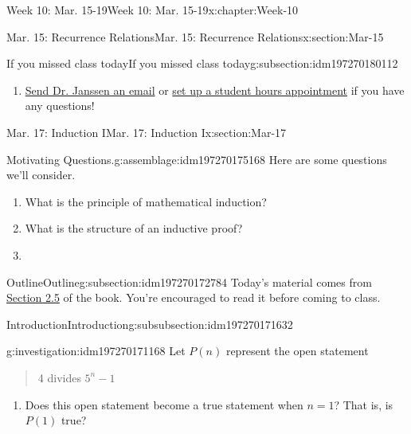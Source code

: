 \documentclass[oneside,10pt,]{book}
\numberwithin{equation}{section}
\begin{document}
\begin{chapterptx}{Week 10: Mar. 15-19}{}{Week 10: Mar. 15-19}{}{}{x:chapter:Week-10}
\begin{sectionptx}{Mar. 15: Recurrence Relations}{}{Mar. 15: Recurrence Relations}{}{}{x:section:Mar-15}
\begin{subsectionptx}{If you missed class today}{}{If you missed class today}{}{}{g:subsection:idm197270180112}
\begin{enumerate}
\item{}\href{mailto:mike.janssen@dordt.edu}{Send Dr. Janssen an email} or \href{https://calendly.com/mkjanssen/student-hours}{set up a student hours appointment} if you have any questions!%
\end{enumerate}
\end{subsectionptx}
\end{sectionptx}
%
%
\typeout{************************************************}
\typeout{************************************************}
%
\begin{sectionptx}{Mar. 17: Induction I}{}{Mar. 17: Induction I}{}{}{x:section:Mar-17}
\begin{introduction}{}%
\begin{assemblage}{Motivating Questions.}{g:assemblage:idm197270175168}%
Here are some questions we'll consider. %
\begin{enumerate}
\item{}What is the principle of mathematical induction?%
\item{}What is the structure of an inductive proof?%
\item{}%
\end{enumerate}
%
\end{assemblage}
\end{introduction}%
%
%
\typeout{************************************************}
\typeout{************************************************}
%
\begin{subsectionptx}{Outline}{}{Outline}{}{}{g:subsection:idm197270172784}
Today's material comes from \href{http://discrete.openmathbooks.org/dmoi3/sec_seq-induction.html}{Section 2.5} of the book. You're encouraged to read it before coming to class.%
%
%
\typeout{************************************************}
\typeout{************************************************}
%
\begin{subsubsectionptx}{Introduction}{}{Introduction}{}{}{g:subsubsection:idm197270171632}
\begin{investigation}{}{g:investigation:idm197270171168}%
Let \(P(n)\) represent the open statement%
\begin{quote}%
4 divides \(5^n - 1\)\end{quote}
%
\begin{enumerate}
\item{}Does this open statement become a true statement when \(n=1\)? That is, is \(P(1)\) true?%

\end{enumerate}
\end{investigation}
\end{subsubsectionptx}
\end{subsectionptx}
\end{sectionptx}
\end{chapterptx}
\end{document}
